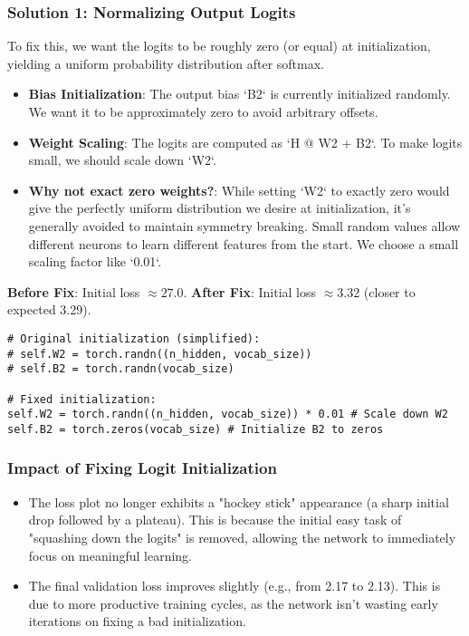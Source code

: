 \subsubsection{Solution 1: Normalizing Output Logits}
To fix this, we want the logits to be roughly zero (or equal) at initialization, yielding a uniform probability distribution after softmax.
\begin{itemize}
    \item \textbf{Bias Initialization}: The output bias `B2` is currently initialized randomly. We want it to be approximately zero to avoid arbitrary offsets.
    \item \textbf{Weight Scaling}: The logits are computed as `H @ W2 + B2`. To make logits small, we should scale down `W2`.
    \item \textbf{Why not exact zero weights?}: While setting `W2` to exactly zero would give the perfectly uniform distribution we desire at initialization, it's generally avoided to maintain symmetry breaking. Small random values allow different neurons to learn different features from the start. We choose a small scaling factor like `0.01`.
\end{itemize}

\textbf{Before Fix}: Initial loss $\approx 27.0$.
\textbf{After Fix}: Initial loss $\approx 3.32$ (closer to expected 3.29).

\begin{lstlisting}
# Original initialization (simplified):
# self.W2 = torch.randn((n_hidden, vocab_size))
# self.B2 = torch.randn(vocab_size)

# Fixed initialization:
self.W2 = torch.randn((n_hidden, vocab_size)) * 0.01 # Scale down W2
self.B2 = torch.zeros(vocab_size) # Initialize B2 to zeros
\end{lstlisting}

\subsubsection{Impact of Fixing Logit Initialization}
\begin{itemize}
    \item The loss plot no longer exhibits a "hockey stick" appearance (a sharp initial drop followed by a plateau). This is because the initial easy task of "squashing down the logits" is removed, allowing the network to immediately focus on meaningful learning.
    \item The final validation loss improves slightly (e.g., from 2.17 to 2.13). This is due to more productive training cycles, as the network isn't wasting early iterations on fixing a bad initialization.
\end{itemize}

